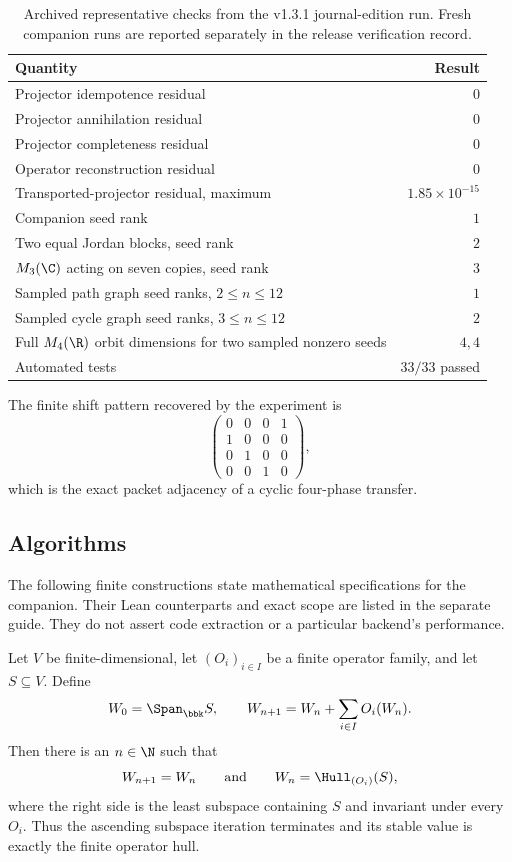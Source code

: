 \begin{table}[htbp]
\centering
\caption{Archived representative checks from the v1.3.1 journal-edition run. Fresh companion runs are reported separately in the release verification record.}
\label{tab:results}
\begin{tabular}{L{0.57\textwidth}r}
\toprule
Quantity & Result \\
\midrule
Projector idempotence residual & $0$ \\
Projector annihilation residual & $0$ \\
Projector completeness residual & $0$ \\
Operator reconstruction residual & $0$ \\
Transported-projector residual, maximum & $1.85\times10^{-15}$ \\
Companion seed rank & $1$ \\
Two equal Jordan blocks, seed rank & $2$ \\
$M_3(\C)$ acting on seven copies, seed rank & $3$ \\
Sampled path graph seed ranks, $2\le n\le12$ & $1$ \\
Sampled cycle graph seed ranks, $3\le n\le12$ & $2$ \\
Full $M_4(\R)$ orbit dimensions for two sampled nonzero seeds & $4,4$ \\
Automated tests & $33/33$ passed \\
\bottomrule
\end{tabular}
\end{table}

The finite shift pattern recovered by the experiment is
\[
\begin{pmatrix}
0&0&0&1\\
1&0&0&0\\
0&1&0&0\\
0&0&1&0
\end{pmatrix},
\]
which is the exact packet adjacency of a cyclic four-phase transfer.

\subsection{Algorithms}

The following finite constructions state mathematical specifications for the companion. Their Lean counterparts and exact scope are listed in the separate guide. They do not assert code extraction or a particular backend's performance.

\begin{construction}
\label{con:orbit-hull-algorithm}
Let $V$ be finite-dimensional, let $(O_i)_{i\in I}$ be a finite operator
family, and let $S\subseteq V$.  Define
\[
W_0=\Span_{\bbk}S,
\qquad
W_{n+1}=W_n+\sum_{i\in I}O_i(W_n).
\]
Then there is an $n\in\N$ such that
\[
W_{n+1}=W_n
\qquad\text{and}\qquad
W_n=\Hull_{(O_i)}(S),
\]
where the right side is the least subspace containing $S$ and invariant under
every $O_i$.  Thus the ascending subspace iteration terminates and its stable
value is exactly the finite operator hull.
\end{construction}

